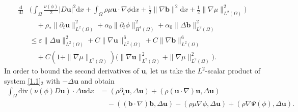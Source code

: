 \documentclass[11pt]{article}
\numberwithin{equation}{section}
\begin{document}
\begin{equation}\label{4.40}
\begin{split}
\frac{\mathrm{d}}{\mathrm{d}t}&\Big(\int_{\Omega}\frac{\nu(\phi)}{2}
|D\mathbf{u}|^2\mathrm{d}x+\int_{\Omega}\rho\mu\mathbf{u}\cdot
\nabla\phi\mathrm{d}x+\frac{1}{2}\|\nabla\mathbf{b}\|^2\mathrm{d}x
+\frac{1}{2}\|\nabla\mu\|_{L^2(\Omega)}^2\Big)\\
&\quad+\rho_*\|\partial_t\mathbf{u}\|_{L^2(\Omega)}^2
+\alpha_0\|\partial_t\phi\|_{H^1(\Omega)}^2 +
\alpha_0\|\Delta\mathbf{b}\|_{L^2(\Omega)}^2\\
&\leq \varepsilon\|\Delta\mathbf{u}\|_{L^2(\Omega)}^2 + C\|\nabla\mathbf{u}\|_{L^2(\Omega)}^6 +C\|\nabla\mathbf{b}\|_{L^2(\Omega)}^6 \\
&\quad + C(1 + \|\nabla\mu\|_{L^2(\Omega)})\big(\|\nabla\mathbf{u}\|_{L^2(\Omega)}^2 + \|\nabla\mu\|_{L^2(\Omega)}^2\big).
\end{split}
\end{equation}
In order to bound the second derivatives of $\mathbf{u}$, let us take the  $L^2$-scalar product  of  system  \eqref{1.1}$_{2}$  with $-\Delta \mathbf{u}$
  and obtain
\begin{equation}\label{4.41}
\begin{split}
\int_{\Omega}\text{div}(\nu(\phi)D\mathbf{u})\cdot\Delta
\mathbf{u}\mathrm{d}x&=(\rho\partial_t\mathbf{u},\Delta\mathbf{u})+
(\rho(\mathbf{u}\cdot\nabla)\mathbf{u},\Delta\mathbf{u}) \\
&\quad - ((\mathbf{b}\cdot\nabla)\mathbf{b},\Delta\mathbf{u})-(\rho\mu\nabla\phi,\Delta\mathbf{u})+(\rho\nabla\Psi(\phi),\Delta
\mathbf{u}).
\end{split}
\end{equation}
\end{document}
